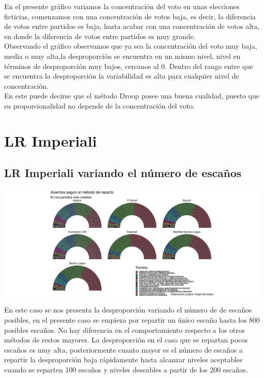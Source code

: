 \documentclass[12pt,a4paper,]{book}
\numberwithin{dummy}{section}
\theoremstyle{ocrenumbox}
\theoremstyle{blacknumex}
\theoremstyle{blacknumbox}
\theoremstyle{ocrenum}
\theoremstyle{ocrenum}
\begin{document}
En el presente gráfico variamos la concentración del voto en unas
elecciones ficticias, comenzamos con una concentración de votos baja, es
decir, la diferencia de votos entre partidos es baja, hasta acabar con
una concentración de votos alta, en donde la diferencia de votos entre
partidos es muy grande.\\
Observando el gráfico observamos que ya sea la concentración del voto
muy baja, media o muy alta,la desproporción se encuentra en un mismo
nivel, nivel en términos de desproporción muy bajos, cercanos al 0.
Dentro del rango entre que se encuentra la desproporción la variabilidad
es alta para cualquier nivel de concentración.\\
En este puede decirse que el método Droop posee una buena cualidad,
puesto que su proporcionalidad no depende de la concentración del voto.

\hypertarget{lr-imperiali}{%
\section{LR Imperiali}\label{lr-imperiali}}

\hypertarget{lr-imperiali-variando-el-nuxfamero-de-escauxf1os}{%
\subsection{LR Imperiali variando el número de
escaños}\label{lr-imperiali-variando-el-nuxfamero-de-escauxf1os}}

\begin{center}\includegraphics[width=0.95\linewidth]{figurasR/unnamed-chunk-61-1} \end{center}

En este caso se nos presenta la desproporción variando el número de de
escaños posibles, en el presente caso se empieza por repartir un único
escaño hasta los 800 posibles escaños. No hay diferencia en el
comportamiento respecto a los otros métodos de restos mayores. La
desproporción en el caso que se repartan pocos escaños es muy alta,
posteriormente cuanto mayor es el número de escaños a repartir la
desproporción baja rápidamente hasta alcanzar niveles aceptables cuando
se reparten 100 escaños y niveles deseables a partir de los 200 escaños.
\end{document}
